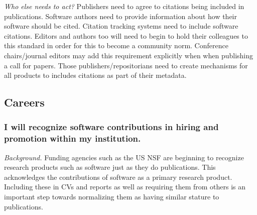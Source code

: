 \documentclass[a4paper,UKenglish]{dagman}
\renewcommand{\paragraph}[1]{\subsubsection*{#1}\xspace}
\newcommand{\etc}{\emph{etc.}\xspace}
\begin{document}
\emph{Who else needs to act?} Publishers need to agree to citations being included in publications. Software authors need to provide information about how their software should be cited. Citation tracking systems need to include software citations. 
Editors and authors too will need to begin to hold their colleagues to this standard in order for this to become a community norm.
Conference chairs/journal editors may add this requirement explicitly when when publishing a call for papers. Those publishers/repositorians   need to create mechanisms for all products to includes citations as part of their metadata.





\subsection*{Careers}

\paragraph{I will recognize software contributions in hiring and promotion within my institution.}

\emph{Background.}
Funding agencies such as the US NSF are beginning to recognize research products such as software just as they do publications. This acknowledges the contributions of software as a primary research product. Including these in CVs and reports as well as requiring them from others is an important step towards normalizing them as having similar stature to publications. 
\end{document}
